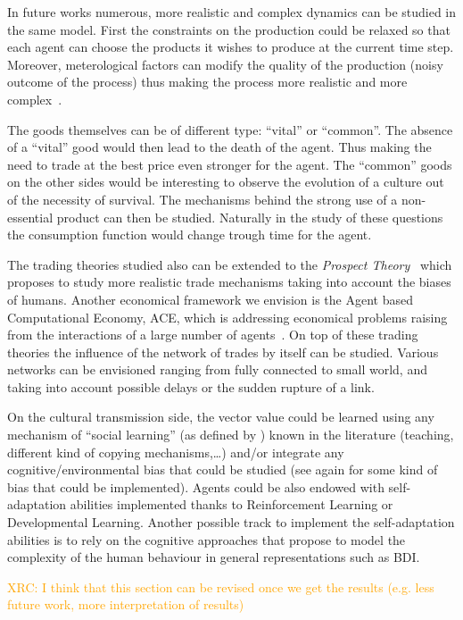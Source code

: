 \documentclass{wscpaperproc}
\newcommand{\memo}[2]{\textcolor{#1}{#2}}
\newcommand{\xrc}[1]{\memo{orange}{XRC: #1\\}}
\begin{document}
In future works numerous, more realistic and complex dynamics can be studied in the same model. First the constraints on the production could be relaxed so that each agent can choose the products it wishes to produce at the current time step. Moreover, meterological factors can modify the quality of the production (noisy outcome of the process) thus making the process more realistic and more complex~.

The goods themselves can be of different type: ``vital'' or ``common''. The absence of a ``vital'' good would then lead to the death of the agent. Thus making the need to trade at the best price even stronger for the agent. The ``common'' goods on the other sides would be interesting to observe the evolution of a culture out of the necessity of survival. The mechanisms behind the strong use of a non-essential product can then be studied. Naturally in the study of these questions the consumption function would change trough time for the agent.

The trading theories studied also can be extended to the \emph{Prospect Theory}~ which proposes to study more realistic trade mechanisms taking into account the biases of humans. Another economical framework we envision is the Agent based Computational Economy, ACE, which is  addressing economical problems raising from the interactions of a large number of agents~. On top of these trading theories the influence of the network of trades by itself can be studied. Various networks can be envisioned ranging from fully connected to small world, and taking into account possible delays or the sudden rupture of a link.

On the cultural transmission side, the vector value could be learned using any mechanism of ``social learning'' (as defined by ) known in the literature (teaching, different kind of copying mechanisms,\ldots) and/or integrate any cognitive/environmental bias that could be studied (see again  for some kind of bias that could be implemented). Agents could be also endowed with self-adaptation abilities implemented thanks to Reinforcement Learning or Developmental Learning. Another possible track to implement the self-adaptation abilities is to rely on the cognitive approaches that propose to model the complexity of the human behaviour in general representations such as BDI.

\xrc{I think that this section can be revised once we get the results (e.g. less future work, more interpretation of results)}
\end{document}
